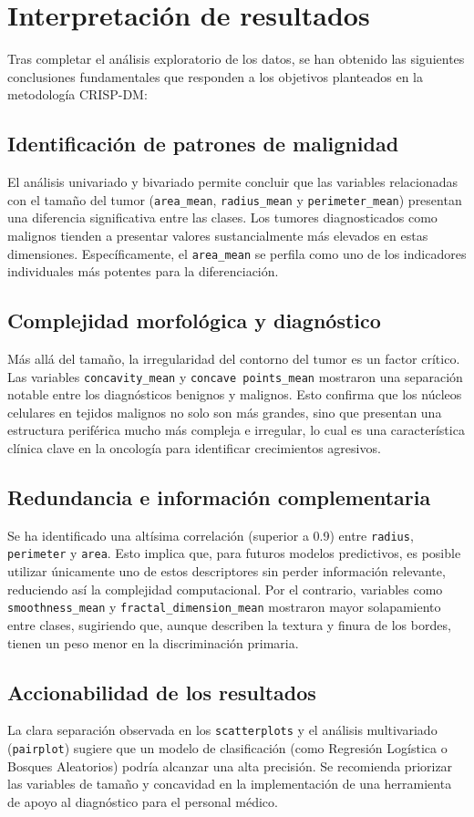 \section{Interpretación de resultados}

Tras completar el análisis exploratorio de los datos, se han obtenido las siguientes conclusiones fundamentales que responden a los objetivos planteados en la metodología CRISP-DM:

\subsection{Identificación de patrones de malignidad}
El análisis univariado y bivariado permite concluir que las variables relacionadas con el tamaño del tumor (\texttt{area\_mean}, \texttt{radius\_mean} y \texttt{perimeter\_mean}) presentan una diferencia significativa entre las clases. Los tumores diagnosticados como malignos tienden a presentar valores sustancialmente más elevados en estas dimensiones. Específicamente, el \texttt{area\_mean} se perfila como uno de los indicadores individuales más potentes para la diferenciación.

\subsection{Complejidad morfológica y diagnóstico}
Más allá del tamaño, la irregularidad del contorno del tumor es un factor crítico. Las variables \texttt{concavity\_mean} y \texttt{concave points\_mean} mostraron una separación notable entre los diagnósticos benignos y malignos. Esto confirma que los núcleos celulares en tejidos malignos no solo son más grandes, sino que presentan una estructura periférica mucho más compleja e irregular, lo cual es una característica clínica clave en la oncología para identificar crecimientos agresivos.

\subsection{Redundancia e información complementaria}
Se ha identificado una altísima correlación (superior a 0.9) entre \texttt{radius}, \texttt{perimeter} y \texttt{area}. Esto implica que, para futuros modelos predictivos, es posible utilizar únicamente uno de estos descriptores sin perder información relevante, reduciendo así la complejidad computacional. Por el contrario, variables como \texttt{smoothness\_mean} y \texttt{fractal\_dimension\_mean} mostraron mayor solapamiento entre clases, sugiriendo que, aunque describen la textura y finura de los bordes, tienen un peso menor en la discriminación primaria.

\subsection{Accionabilidad de los resultados}
La clara separación observada en los \texttt{scatterplots} y el análisis multivariado (\texttt{pairplot}) sugiere que un modelo de clasificación (como Regresión Logística o Bosques Aleatorios) podría alcanzar una alta precisión. Se recomienda priorizar las variables de tamaño y concavidad en la implementación de una herramienta de apoyo al diagnóstico para el personal médico.
